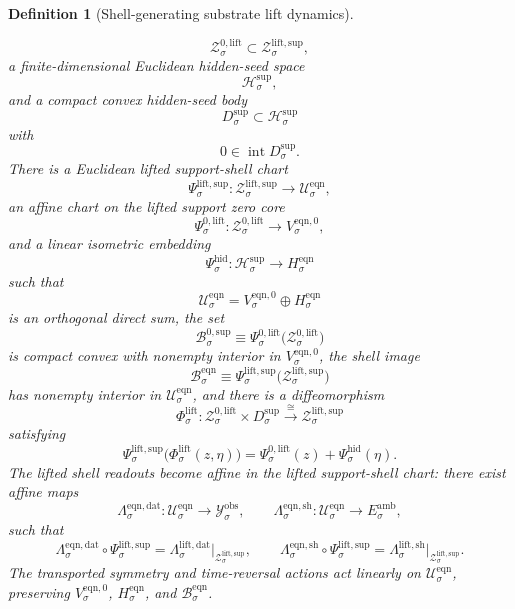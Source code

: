 \documentclass[11pt]{article}
\newcommand{\DataSpace}[1]{\mathcal Y_{#1}^{\mathrm{obs}}}
\newcommand{\AmbientTarget}[1]{E_{#1}^{\mathrm{amb}}}
\newcommand{\EqnSpace}[1]{\mathcal U_{#1}^{\mathrm{eqn}}}
\newcommand{\EqnBody}[1]{\mathcal B_{#1}^{\mathrm{eqn}}}
\newcommand{\EqnData}[1]{\Lambda_{#1}^{\mathrm{eqn,dat}}}
\newcommand{\EqnShell}[1]{\Lambda_{#1}^{\mathrm{eqn,sh}}}
\newcommand{\EqnHidden}[1]{H_{#1}^{\mathrm{eqn}}}
\newcommand{\EqnZero}[1]{V_{#1}^{\mathrm{eqn},0}}
\newcommand{\SeedHidden}[1]{\mathcal H_{#1}^{\mathrm{sup}}}
\newcommand{\SeedHiddenBody}[1]{D_{#1}^{\mathrm{sup}}}
\newcommand{\HiddenChart}[1]{\Psi_{#1}^{\mathrm{hid}}}
\newcommand{\ZeroBody}[1]{\mathcal B_{#1}^{0,\mathrm{sup}}}
\newcommand{\LiftData}[1]{\Lambda_{#1}^{\mathrm{lift,dat}}}
\newcommand{\LiftShellMap}[1]{\Lambda_{#1}^{\mathrm{lift,sh}}}
\newcommand{\LiftSupportShell}[1]{\mathcal Z_{#1}^{\mathrm{lift,sup}}}
\newcommand{\LiftZeroCore}[1]{\mathcal Z_{#1}^{0,\mathrm{lift}}}
\newcommand{\LiftEqChart}[1]{\Psi_{#1}^{\mathrm{lift,sup}}}
\newcommand{\LiftZeroChart}[1]{\Psi_{#1}^{0,\mathrm{lift}}}
\newcommand{\LiftSplit}[1]{\Phi_{#1}^{\mathrm{lift}}}
\newtheorem{definition}{Definition}
\begin{document}
\begin{definition}[Shell-generating substrate lift dynamics]
\begin{enumerate}
    \[
    \LiftZeroCore{\sigma}\subset\LiftSupportShell{\sigma},
    \]
    a finite-dimensional Euclidean hidden-seed space
    \[
    \SeedHidden{\sigma},
    \]
    and a compact convex hidden-seed body
    \[
    \SeedHiddenBody{\sigma}\subset\SeedHidden{\sigma}
    \]
    with
    \[
    0\in\operatorname{int}\SeedHiddenBody{\sigma}.
    \]
    There is a Euclidean lifted support-shell chart
    \[
    \LiftEqChart{\sigma}:\LiftSupportShell{\sigma}\to\EqnSpace{\sigma},
    \]
    an affine chart on the lifted support zero core
    \[
    \LiftZeroChart{\sigma}:\LiftZeroCore{\sigma}\to\EqnZero{\sigma},
    \]
    and a linear isometric embedding
    \[
    \HiddenChart{\sigma}:\SeedHidden{\sigma}\to\EqnHidden{\sigma}
    \]
    such that
    \[
    \EqnSpace{\sigma}
    =
    \EqnZero{\sigma}\oplus\EqnHidden{\sigma}
    \]
    is an orthogonal direct sum, the set
    \[
    \ZeroBody{\sigma}
    \equiv
    \LiftZeroChart{\sigma}\bigl(\LiftZeroCore{\sigma}\bigr)
    \]
    is compact convex with nonempty interior in \(\EqnZero{\sigma}\), the shell image
    \[
    \EqnBody{\sigma}
    \equiv
    \LiftEqChart{\sigma}\bigl(\LiftSupportShell{\sigma}\bigr)
    \]
    has nonempty interior in \(\EqnSpace{\sigma}\), and there is a diffeomorphism
    \begin{equation}
    \LiftSplit{\sigma}:
    \LiftZeroCore{\sigma}\times\SeedHiddenBody{\sigma}
    \xrightarrow{\cong}
    \LiftSupportShell{\sigma}
    \label{eq:liftsplit}
    \end{equation}
    satisfying
    \begin{equation}
    \LiftEqChart{\sigma}\bigl(\LiftSplit{\sigma}(z,\eta)\bigr)
    =
    \LiftZeroChart{\sigma}(z)+\HiddenChart{\sigma}(\eta).
    \label{eq:liftchartsplit}
    \end{equation}
    The lifted shell readouts become affine in the lifted support-shell chart: there exist affine maps
    \[
    \EqnData{\sigma}:\EqnSpace{\sigma}\to\DataSpace{\sigma},
    \qquad
    \EqnShell{\sigma}:\EqnSpace{\sigma}\to\AmbientTarget{\sigma},
    \]
    such that
    \begin{equation}
    \EqnData{\sigma}\circ\LiftEqChart{\sigma}
    =
    \LiftData{\sigma}\big|_{\LiftSupportShell{\sigma}},
    \qquad
    \EqnShell{\sigma}\circ\LiftEqChart{\sigma}
    =
    \LiftShellMap{\sigma}\big|_{\LiftSupportShell{\sigma}}.
    \label{eq:lifteqnchartreadouts}
    \end{equation}
    The transported symmetry and time-reversal actions act linearly on \(\EqnSpace{\sigma}\), preserving \(\EqnZero{\sigma}\), \(\EqnHidden{\sigma}\), and \(\EqnBody{\sigma}\).

\end{enumerate}
\end{definition}
\end{document}

